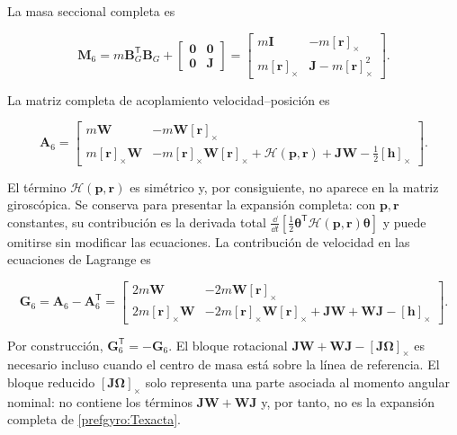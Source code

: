 La masa seccional completa es

\begin{equation}
 \bm M_6
 =m\bm B_G^{\mathsf T}\bm B_G
 +\begin{bmatrix}\bm 0&\bm 0\\\bm 0&\bm J\end{bmatrix}
 =\begin{bmatrix}
 m\bm I&-m[\bm r]_\times\\
 m[\bm r]_\times&\bm J-m[\bm r]_\times^2
 \end{bmatrix}.
 \label{prefgyro:M6}
\end{equation}

La matriz completa de acoplamiento velocidad--posición es

\begin{equation}
 \bm A_6
 =\begin{bmatrix}
 m\bm W&-m\bm W[\bm r]_\times\\
 m[\bm r]_\times\bm W&
 -m[\bm r]_\times\bm W[\bm r]_\times
 +\mathcal H(\bm p,\bm r)+\bm J\bm W-\tfrac12[\bm h]_\times
 \end{bmatrix}.
 \label{prefgyro:A6}
\end{equation}

El término $\mathcal H(\bm p,\bm r)$ es simétrico y, por consiguiente, no
aparece en la matriz giroscópica. Se conserva para presentar la expansión
completa: con $\bm p,\bm r$ constantes, su contribución es la derivada total
$\frac{\dd}{\dd t}[\tfrac12\bm\theta^{\mathsf T}\mathcal H(\bm p,\bm r)\bm\theta]$
y puede omitirse sin modificar las ecuaciones. La contribución de
velocidad en las ecuaciones de Lagrange es

\begin{equation}
 \boxed{\bm G_6=\bm A_6-\bm A_6^{\mathsf T}}
 =\begin{bmatrix}
 2m\bm W&-2m\bm W[\bm r]_\times\\
 2m[\bm r]_\times\bm W&
 -2m[\bm r]_\times\bm W[\bm r]_\times
 +\bm J\bm W+\bm W\bm J-[\bm h]_\times
 \end{bmatrix}.
 \label{prefgyro:G6}
\end{equation}

Por construcción, $\bm G_6^{\mathsf T}=-\bm G_6$. El bloque rotacional
$\bm J\bm W+\bm W\bm J-[\bm J\bm\Omega]_\times$ es necesario incluso cuando
el centro de masa está sobre la línea de referencia. El bloque reducido
$[\bm J\bm\Omega]_\times$ solo representa una parte asociada al momento
angular nominal: no contiene los términos $\bm J\bm W+\bm W\bm J$ y, por
tanto, no es la expansión completa de \eqref{prefgyro:Texacta}.


